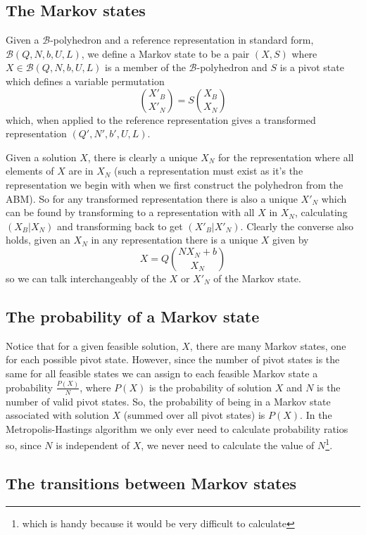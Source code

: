 \documentclass{article}
\begin{document}
\subsection{The Markov states}

Given a $\mathcal{B}$-polyhedron and a reference representation in standard form, $\mathcal{B}(Q,N,b,U,L)$, we define a Markov state to be a pair $(X,S)$ where $X \in \mathcal{B}(Q,N,b,U,L)$ is a member of the $\mathcal{B}$-polyhedron and $S$ is a pivot state which defines a variable permutation
\[
{X'_B \choose X'_N} = S{X_B \choose X_N}
\]
which, when applied to the reference representation gives a transformed representation $(Q',N',b',U,L)$.

Given a solution $X$, there is clearly a unique $X_N$ for the representation where all elements of $X$ are in $X_N$ (such a representation must exist as it's the representation we begin with when we first construct the polyhedron from the ABM). So for any transformed representation there is also a unique $X'_N$ which can be found by transforming to a representation with all $X$ in $X_N$, calculating $(X_B|X_N)$ and transforming back to get $(X'_B|X'_N)$. Clearly the converse also holds, given an $X_N$ in any representation there is a unique $X$ given by
\[
X = Q{N X_N + b \choose X_N}
\]
so we can talk interchangeably of the $X$ or $X'_N$ of the Markov state.

\subsection{The probability of a Markov state}

Notice that for a given feasible solution, $X$, there are many Markov states, one for each possible pivot state. However, since the number of pivot states is the same for all feasible states we can assign to each feasible Markov state a probability $\frac{P(X)}{N}$, where $P(X)$ is the probability of solution $X$ and $N$ is the number of valid pivot states. So, the probability of being in a Markov state associated with solution $X$ (summed over all pivot states) is $P(X)$. In the Metropolis-Hastings algorithm we only ever need to calculate probability ratios so, since $N$ is independent of $X$, we never need to calculate the value of $N$\footnote{which is handy because it would be very difficult to calculate}.

\subsection{The transitions between Markov states}
\end{document}
